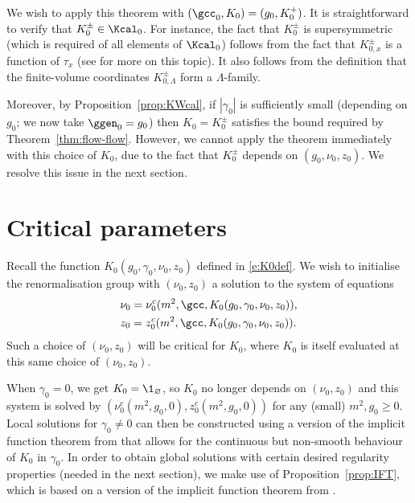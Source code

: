 We wish to apply this theorem with $(\gcc_0, K_0) = (g_0, K^+_0)$.
It is straightforward to verify that $K^\pm_0 \in \Kcal_0$.
For instance, the fact that $K^\pm_0$ is supersymmetric
(which is required of all elements of $\Kcal_0$) follows
from the fact that $K^\pm_{0,x}$ is a function of $\tau_x$
(see \cite[Section~\ref{pt-sec:bulksym}]{BBS-rg-pt} for more on this topic).
It also follows from the definition that
the finite-volume coordinates $K^\pm_{0,\Lambda}$ form a $\Lambda$-family.

Moreover,
by Proposition~\ref{prop:KWcal}, if
$|\gamma_0|$ is sufficiently small (depending on $g_0$; we now take $\ggen_0=g_0$)
then $K_0 = K^\pm_0$ satisfies the bound required by Theorem~\ref{thm:flow-flow}.
However, we cannot apply the theorem immediately with this choice
of $K_0$,
due to the fact that $K^\pm_0$
depends on $(g_0, \nu_0, z_0)$.
We resolve this issue in the next section.

\section{Critical parameters}
\label{sec:nu0z0c}

Recall the function $K_0(g_0, \gamma_0, \nu_0, z_0)$
defined in \eqref{e:K0def}.
We wish to initialise the renormalisation group with $(\nu_0, z_0)$ a solution
to the system of equations
\begin{align}
&\nu_0 = \nu_0^c(m^2, \gcc, K_0(g_0, \gamma_0, \nu_0, z_0)), \label{e:mu0c}
\\
&z_0 = z_0^c(m^2, \gcc, K_0(g_0, \gamma_0, \nu_0, z_0)) \label{e:z0c}
.
\end{align}
Such a choice of $(\nu_0, z_0)$ will be critical for $K_0$,
where $K_0$ is itself evaluated at this same choice of $(\nu_0, z_0)$.

When $\gamma_0 = 0$, we get $K_0 = \1_\varnothing$, so $K_0$ no longer depends on $(\nu_0, z_0)$
and this system is solved by $(\nu_0^c(m^2, g_0, 0), z_0^c(m^2, g_0, 0))$
for any (small) $m^2, g_0 \geq 0$.
Local solutions for $\gamma_0 \neq 0$ can then be
constructed using a version of the implicit function theorem from \cite{LS14}
that allows for the continuous but non-smooth behaviour of $K_0$ in $\gamma_0$.
In order to obtain global solutions with certain desired regularity properties
(needed in the next section), we make use of Proposition~\ref{prop:IFT},
which is based on a version of the implicit function theorem from \cite{LS14}.


